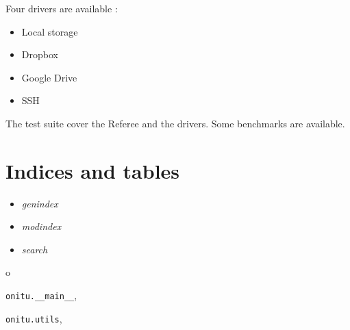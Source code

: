 \documentclass[letterpaper,10pt,english]{sphinxmanual}
\begin{document}
Four drivers are available :
\begin{itemize}
\item {} 
Local storage

\item {} 
Dropbox

\item {} 
Google Drive

\item {} 
SSH

\end{itemize}

The test suite cover the Referee and the drivers. Some benchmarks are available.


\chapter{Indices and tables}
\label{index:indices-and-tables}\begin{itemize}
\item {} 
\emph{genindex}

\item {} 
\emph{modindex}

\item {} 
\emph{search}

\end{itemize}


\renewcommand{\indexname}{Python Module Index}
\begin{theindex}
\def\bigletter#1{{\Large\sffamily#1}\nopagebreak\vspace{1mm}}
\bigletter{o}
\item {\texttt{onitu.\_\_main\_\_}}, \pageref{components:module-onitu.__main__}
\item {\texttt{onitu.utils}}, \pageref{components:module-onitu.utils}
\end{theindex}

\renewcommand{\indexname}{Index}
\printindex
\end{document}
